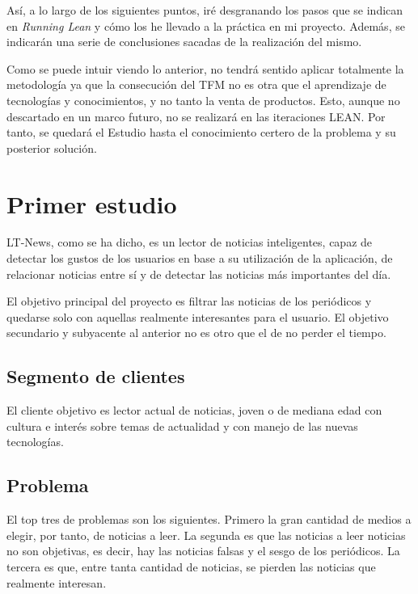 Así, a lo largo de los siguientes puntos, iré desgranando los pasos que se indican en \textit{Running Lean} y cómo los he llevado a la práctica en mi proyecto. Además, se indicarán una serie de conclusiones sacadas de la realización del mismo.

Como se puede intuir viendo lo anterior, no tendrá sentido aplicar totalmente la metodología ya que la consecución del TFM no es otra que el aprendizaje de tecnologías y conocimientos, y no tanto la venta de productos. Esto, aunque no descartado en un marco futuro, no se realizará en las iteraciones LEAN. Por tanto, se quedará el Estudio hasta el conocimiento certero de la problema y su posterior solución.


\section{Primer estudio}\label{sec:primer_estudio}

LT-News, como se ha dicho, es un lector de noticias inteligentes, capaz de detectar los gustos de los usuarios en base a su utilización de la aplicación, de relacionar noticias entre sí y de detectar las noticias más importantes del día.

El objetivo principal del proyecto es filtrar las noticias de los periódicos y quedarse solo con aquellas realmente interesantes para el usuario. El objetivo secundario y subyacente al anterior no es otro que el de no perder el tiempo.


\subsection{Segmento de clientes}
El cliente objetivo es lector actual de noticias, joven o de mediana edad con cultura e interés sobre temas de actualidad y con manejo de las nuevas tecnologías. 

\subsection{Problema}
El top tres de problemas son los siguientes. Primero la gran cantidad de medios a elegir, por tanto, de noticias a leer. La segunda es que las noticias a leer noticias no son objetivas, es decir, hay las noticias falsas y el sesgo de los periódicos. La tercera es que, entre tanta cantidad de noticias, se pierden las noticias que realmente interesan.

